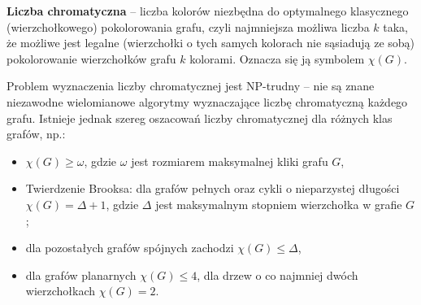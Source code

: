 \textbf{Liczba chromatyczna} – liczba kolorów niezbędna do optymalnego klasycznego (wierzchołkowego) pokolorowania grafu,
czyli najmniejsza możliwa liczba $k$ taka, że możliwe jest legalne
(wierzchołki o tych samych kolorach nie sąsiadują ze sobą)
pokolorowanie wierzchołków grafu $k$ kolorami.
Oznacza się ją symbolem $\chi (G)$.

Problem wyznaczenia liczby chromatycznej jest NP-trudny
– nie są znane niezawodne wielomianowe algorytmy wyznaczające liczbę chromatyczną każdego grafu.
Istnieje jednak szereg oszacowań liczby chromatycznej dla różnych klas grafów, np.:

\begin{itemize}[itemsep=0pt,partopsep=0pt, parsep=0pt]
    \item $\chi (G)\geqslant \omega$, gdzie $\omega$  jest rozmiarem maksymalnej kliki grafu $G$,
    \item Twierdzenie Brooksa: dla grafów pełnych oraz cykli o nieparzystej długości $\chi (G)=\Delta +1$,
    gdzie $\Delta$  jest maksymalnym stopniem wierzchołka w grafie $G$;
    \item dla pozostałych grafów spójnych zachodzi $ \chi (G)\leqslant \Delta$,
    \item dla grafów planarnych  $\chi (G)\leqslant 4$, dla drzew o co najmniej dwóch wierzchołkach $\chi (G)=2$.
\end{itemize}
